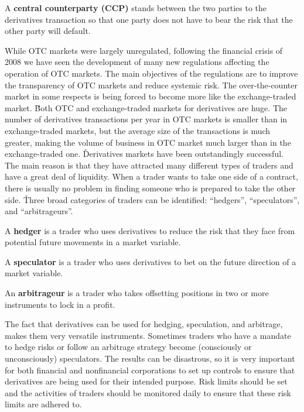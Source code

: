 A \textbf{central counterparty (CCP)} stands between the two parties to the derivatives transaction so that one party
does not have to bear the risk that the other party will default.
\ed

While OTC markets were largely unregulated, following the financial crisis of 2008 we have seen the development of
many new regulations affecting the operation of OTC markets. The main objectives of the regulations are to improve
the transparency of OTC markets and reduce systemic risk. The over-the-counter market in some respects is being forced
to become more like the exchange-traded market. \v

Both OTC and exchange-traded markets for derivatives are huge. The number of derivatives transactions per year in OTC
markets is smaller than in exchange-traded markets, but the average size of the transactions is much greater, making the
volume of business in OTC market much larger than in the exchange-traded one. \v

Derivatives markets have been outstandingly successful. The main reason is that they have attracted many different
types of traders and have a great deal of liquidity. When a trader wants to take one side of a contract,
there is usually no problem in finding someone who is prepared to take the other side. \v

Three broad categories of traders can be identified: ``hedgers'', ``speculators'', and ``arbitrageurs''.

\bd[Hedger]
A \textbf{hedger} is a trader who uses derivatives to reduce the risk that they face from potential future movements in
a market variable.
\ed

\bd[Speculator]
A \textbf{speculator} is a trader who uses derivatives to bet on the future direction of a market variable.
\ed

\bd[Arbitrageur]
An \textbf{arbitrageur} is a trader who takes offsetting positions in two or more instruments to lock in a profit.
\ed

The fact that derivatives can be used for hedging, speculation, and arbitrage, makes them very versatile instruments.
Sometimes traders who have a mandate to hedge risks or follow an arbitrage strategy become (consciously or
unconsciously) speculators. The results can be disastrous, so it is very important for both financial and
nonfinancial corporations to set up controls to ensure that derivatives are being used for their intended purpose.
Risk limits should be set and the activities of traders should be monitored daily to ensure that these risk limits
are adhered to.

